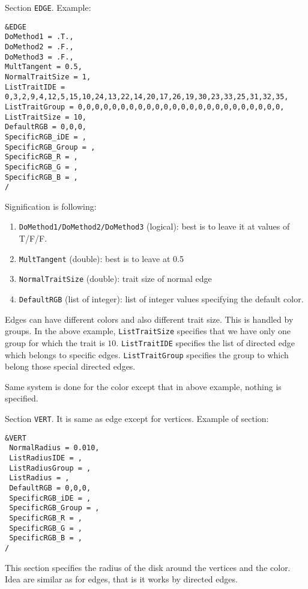 \documentclass[12pt]{amsart}
\begin{document}
Section {\tt EDGE}. Example:
\begin{verbatim}
&EDGE
DoMethod1 = .T.,
DoMethod2 = .F.,
DoMethod3 = .F.,
MultTangent = 0.5,
NormalTraitSize = 1,
ListTraitIDE = 0,3,2,9,4,12,5,15,10,24,13,22,14,20,17,26,19,30,23,33,25,31,32,35,
ListTraitGroup = 0,0,0,0,0,0,0,0,0,0,0,0,0,0,0,0,0,0,0,0,0,0,0,0,
ListTraitSize = 10,
DefaultRGB = 0,0,0,
SpecificRGB_iDE = ,
SpecificRGB_Group = ,
SpecificRGB_R = ,
SpecificRGB_G = ,
SpecificRGB_B = ,
/
\end{verbatim}


Signification is following:
\begin{enumerate}
\item {\tt DoMethod1/DoMethod2/DoMethod3} (logical): best is to leave it at values of T/F/F.
\item {\tt MultTangent} (double): best is to leave at 0.5
\item {\tt NormalTraitSize} (double): trait size of normal edge
\item {\tt DefaultRGB} (list of integer): list of integer values specifying the default color.
\end{enumerate}
Edges can have different colors and also different trait size. This is handled by groups.
In the above example, {\tt ListTraitSize} specifies that we have only one group for which
the trait is $10$.
{\tt ListTraitIDE} specifies the list of directed edge which belongs to specific edges.
{\tt ListTraitGroup} specifies the group to which belong those special directed edges.

Same system is done for the color except that in above example, nothing is specified.



Section {\tt VERT}. It is same as edge except for vertices. Example of section:
\begin{verbatim}
&VERT
 NormalRadius = 0.010,
 ListRadiusIDE = ,
 ListRadiusGroup = ,
 ListRadius = ,
 DefaultRGB = 0,0,0,
 SpecificRGB_iDE = ,
 SpecificRGB_Group = ,
 SpecificRGB_R = ,
 SpecificRGB_G = ,
 SpecificRGB_B = ,
/
\end{verbatim}

This section specifies the radius of the disk around the vertices and the color. Idea are similar
as for edges, that is it works by directed edges.
\end{document}
